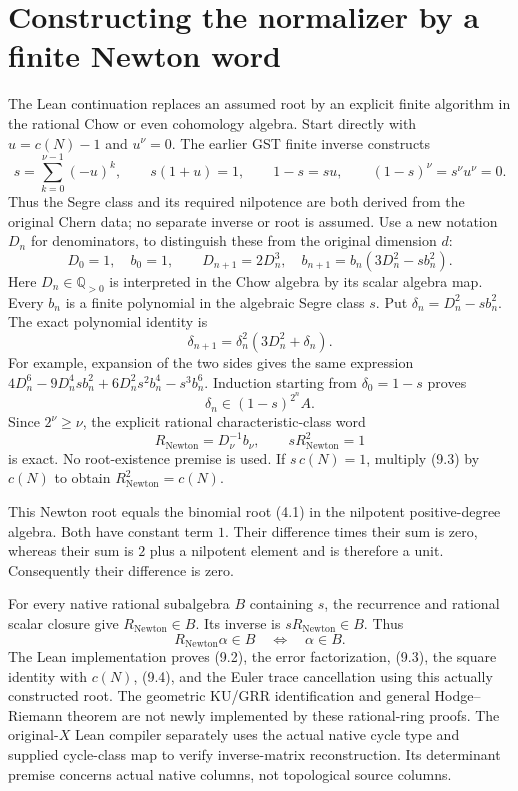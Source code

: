 \documentclass[11pt]{article}
\newcommand{\Q}{\mathbb Q}
\begin{document}
\section{Constructing the normalizer by a finite Newton word}
The Lean continuation replaces an assumed root by an explicit
finite algorithm in the rational Chow or even cohomology algebra.
Start directly with $u=c(N)-1$ and $u^\nu=0$.
The earlier GST finite inverse constructs
\[
 s=\sum_{k=0}^{\nu-1}(-u)^k,\qquad s(1+u)=1,\qquad
 1-s=su,\qquad (1-s)^\nu=s^\nu u^\nu=0.
\]
Thus the Segre class and its required nilpotence are both derived
from the original Chern data; no separate inverse or root is assumed.
Use a new notation $D_n$ for denominators, to distinguish these
from the original dimension $d$:
\[
 D_0=1,\quad b_0=1,\qquad
 D_{n+1}=2D_n^3,\quad
 b_{n+1}=b_n(3D_n^2-sb_n^2).
 \tag{9.1}
\]
Here $D_n\in\Q_{>0}$ is interpreted in the Chow algebra
by its scalar algebra map. Every $b_n$ is a finite polynomial
in the algebraic Segre class $s$.
Put $\delta_n=D_n^2-sb_n^2$. The exact polynomial identity is
\[
 \boxed{\delta_{n+1}
      =\delta_n^2(3D_n^2+\delta_n).}
 \tag{9.2}
\]
For example, expansion of the two sides gives the same expression
$4D_n^6-9D_n^4sb_n^2+6D_n^2s^2b_n^4-s^3b_n^6$.
Induction starting from $\delta_0=1-s$ proves
\[
 \delta_n\in (1-s)^{2^n}A.
\]
Since $2^\nu\ge\nu$, the explicit rational characteristic-class word
\[
 \boxed{R_{\mathrm{Newton}}=D_\nu^{-1}b_\nu,\qquad
       sR_{\mathrm{Newton}}^2=1}
 \tag{9.3}
\]
is exact. No root-existence premise is used.
If $s\,c(N)=1$, multiply (9.3) by $c(N)$ to obtain
$R_{\mathrm{Newton}}^2=c(N)$.

This Newton root equals the binomial root (4.1) in the
nilpotent positive-degree algebra. Both have constant term $1$.
Their difference times their sum is zero, whereas their sum is
$2$ plus a nilpotent element and is therefore a unit.
Consequently their difference is zero.

For every native rational subalgebra $B$ containing $s$,
the recurrence and rational scalar closure give
$R_{\mathrm{Newton}}\in B$. Its inverse is
$sR_{\mathrm{Newton}}\in B$. Thus
\[
 R_{\mathrm{Newton}}\alpha\in B
       \quad\Longleftrightarrow\quad \alpha\in B.
 \tag{9.4}
\]
The Lean implementation proves (9.2), the error factorization,
(9.3), the square identity with $c(N)$, (9.4), and the Euler
trace cancellation using this actually constructed root.
The geometric KU/GRR identification and general
Hodge--Riemann theorem are not newly implemented by these
rational-ring proofs. The original-$X$ Lean compiler separately
uses the actual native cycle type and supplied cycle-class map
to verify inverse-matrix reconstruction. Its determinant premise
concerns actual native columns, not topological source columns.
\end{document}
